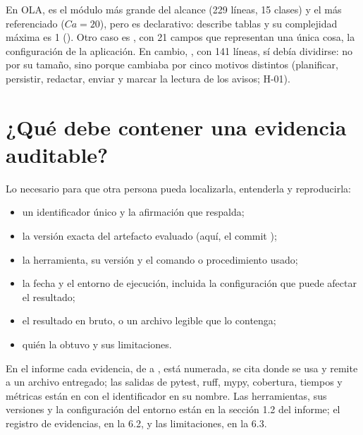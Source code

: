 \documentclass[11pt,a4paper]{article}
\begin{document}
En OLA,  es el módulo más grande del alcance (229 líneas, 15 clases) y el más referenciado ($Ca = 20$), pero es declarativo: describe tablas y su complejidad máxima es 1 (). Otro caso es , con 21 campos que representan una única cosa, la configuración de la aplicación. En cambio, , con 141 líneas, sí debía dividirse: no por su tamaño, sino porque cambiaba por cinco motivos distintos (planificar, persistir, redactar, enviar y marcar la lectura de los avisos; H-01).

\section{¿Qué debe contener una evidencia auditable?}

Lo necesario para que otra persona pueda localizarla, entenderla y reproducirla:

\begin{itemize}
  \item un identificador único y la afirmación que respalda;
  \item la versión exacta del artefacto evaluado (aquí, el commit );
  \item la herramienta, su versión y el comando o procedimiento usado;
  \item la fecha y el entorno de ejecución, incluida la configuración que puede afectar el resultado;
  \item el resultado en bruto, o un archivo legible que lo contenga;
  \item quién la obtuvo y sus limitaciones.
\end{itemize}

En el informe cada evidencia, de  a , está numerada, se cita donde se usa y remite a un archivo entregado; las salidas de pytest, ruff, mypy, cobertura, tiempos y métricas están en  con el identificador en su nombre. Las herramientas, sus versiones y la configuración del entorno están en la sección 1.2 del informe; el registro de evidencias, en la 6.2, y las limitaciones, en la 6.3.
\end{document}
